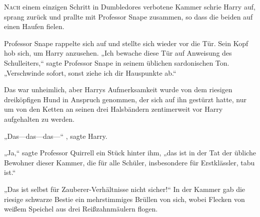 
\lettrine{N}{ach} einem einzigen Schritt in Dumbledores verbotene Kammer schrie Harry auf, sprang zurück und prallte mit Professor Snape zusammen, so dass die beiden auf einen Haufen fielen.

Professor Snape rappelte sich auf und stellte sich wieder vor die Tür. Sein Kopf hob sich, um Harry anzusehen.
„Ich bewache diese Tür auf Anweisung des Schulleiters,“ sagte Professor Snape in seinem üblichen sardonischen Ton. „Verschwinde sofort, sonst ziehe ich dir Hauspunkte ab.“

Das war unheimlich, aber Harrys Aufmerksamkeit wurde von dem riesigen dreiköpfigen Hund in Anspruch genommen, der sich auf ihn gestürzt hatte, nur um von den Ketten an seinen drei Halsbändern zentimerweit vor Harry aufgehalten zu werden.

„Das—das—das—“ , sagte Harry.

„Ja,“ sagte Professor Quirrell ein Stück hinter ihm, „das ist in der Tat der übliche Bewohner dieser Kammer, die für alle Schüler, insbesondere für Erstklässler, tabu ist.“

„Das ist selbst für Zauberer-Verhältnisse nicht sicher!“ In der Kammer gab die riesige schwarze Bestie ein mehrstimmiges Brüllen von sich, wobei Flecken von weißem Speichel aus drei Reißzahnmäulern flogen.

